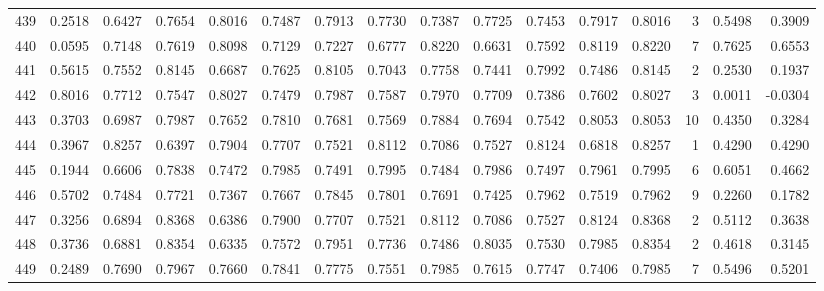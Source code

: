 \begin{tabular}{lrrrrrrrrrrrrrrr}
439 &      0.2518 &  0.6427 &  0.7654 &  0.8016 &  0.7487 &  0.7913 &  0.7730 &  0.7387 &  0.7725 &  0.7453 &   0.7917 &     0.8016 &      3 &                    0.5498 &                     0.3909 \\
440 &      0.0595 &  0.7148 &  0.7619 &  0.8098 &  0.7129 &  0.7227 &  0.6777 &  0.8220 &  0.6631 &  0.7592 &   0.8119 &     0.8220 &      7 &                    0.7625 &                     0.6553 \\
441 &      0.5615 &  0.7552 &  0.8145 &  0.6687 &  0.7625 &  0.8105 &  0.7043 &  0.7758 &  0.7441 &  0.7992 &   0.7486 &     0.8145 &      2 &                    0.2530 &                     0.1937 \\
442 &      0.8016 &  0.7712 &  0.7547 &  0.8027 &  0.7479 &  0.7987 &  0.7587 &  0.7970 &  0.7709 &  0.7386 &   0.7602 &     0.8027 &      3 &                    0.0011 &                    -0.0304 \\
443 &      0.3703 &  0.6987 &  0.7987 &  0.7652 &  0.7810 &  0.7681 &  0.7569 &  0.7884 &  0.7694 &  0.7542 &   0.8053 &     0.8053 &     10 &                    0.4350 &                     0.3284 \\
444 &      0.3967 &  0.8257 &  0.6397 &  0.7904 &  0.7707 &  0.7521 &  0.8112 &  0.7086 &  0.7527 &  0.8124 &   0.6818 &     0.8257 &      1 &                    0.4290 &                     0.4290 \\
445 &      0.1944 &  0.6606 &  0.7838 &  0.7472 &  0.7985 &  0.7491 &  0.7995 &  0.7484 &  0.7986 &  0.7497 &   0.7961 &     0.7995 &      6 &                    0.6051 &                     0.4662 \\
446 &      0.5702 &  0.7484 &  0.7721 &  0.7367 &  0.7667 &  0.7845 &  0.7801 &  0.7691 &  0.7425 &  0.7962 &   0.7519 &     0.7962 &      9 &                    0.2260 &                     0.1782 \\
447 &      0.3256 &  0.6894 &  0.8368 &  0.6386 &  0.7900 &  0.7707 &  0.7521 &  0.8112 &  0.7086 &  0.7527 &   0.8124 &     0.8368 &      2 &                    0.5112 &                     0.3638 \\
448 &      0.3736 &  0.6881 &  0.8354 &  0.6335 &  0.7572 &  0.7951 &  0.7736 &  0.7486 &  0.8035 &  0.7530 &   0.7985 &     0.8354 &      2 &                    0.4618 &                     0.3145 \\
449 &      0.2489 &  0.7690 &  0.7967 &  0.7660 &  0.7841 &  0.7775 &  0.7551 &  0.7985 &  0.7615 &  0.7747 &   0.7406 &     0.7985 &      7 &                    0.5496 &                     0.5201 \\

\end{tabular}
